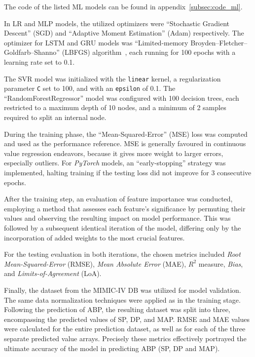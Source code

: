 The code of the listed ML models can be found in appendix~\ref{subsec:code_ml}.

In LR and MLP models, the utilized optimizers were \enquote{Stochastic Gradient Descent} (SGD)\cite{SGDPyTorchDocumentation} and \enquote{Adaptive Moment Estimation} (Adam)\cite{AdamPyTorchDocumentationa} respectively.
The optimizer for LSTM and GRU models was \enquote{Limited-memory Broyden–Fletcher–Goldfarb–Shanno} (LBFGS) algorithm~\cite{LBFGSPyTorchDocumentation}, each running for 100 epochs with a learning rate set to 0.1.

The SVR model was initialized with the \texttt{linear} kernel, a regularization parameter \texttt{C} set to 100, and with an \texttt{epsilon} of 0.1.
The \enquote{RandomForestRegressor} model was configured with 100 decision trees, each restricted to a maximum depth of 10 nodes, and a minimum of 2 samples required to split an internal node.

During the training phase, the \enquote{Mean-Squared-Error} (MSE) loss was computed and used as the performance reference.
MSE is generally favoured in continuous value regression endeavors, because it gives more weight to larger errors, especially outliers.
For \textit{PyTorch} models, an \enquote{early-stopping} strategy was implemented, halting training if the testing loss did not improve for 3 consecutive epochs.

After the training step, an evaluation of feature importance was conducted, employing a method that assesses each feature's significance by permuting their values and observing the resulting impact on model performance.
This was followed by a subsequent identical iteration of the model, differing only by the incorporation of added weights to the most crucial features.

For the testing evaluation in both iterations, the chosen metrics included \textit{Root Mean-Squared-Error} (RMSE), \textit{Mean Absolute Error} (MAE), \textit{$R^2$} measure, \textit{Bias}, and \textit{Limits-of-Agreement} (LoA).

Finally, the dataset from the MIMIC-IV DB was utilized for model validation.
The same data normalization techniques were applied as in the training stage.
Following the prediction of ABP, the resulting dataset was split into three, encompassing the predicted values of SP, DP, and MAP\@.
RMSE and MAE values were calculated for the entire prediction dataset, as well as for each of the three separate predicted value arrays.
Precisely these metrics effectively portrayed the ultimate accuracy of the model in predicting ABP (SP, DP and MAP).
